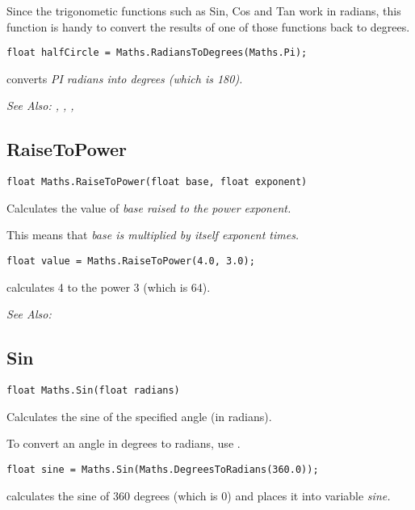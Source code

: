 Since the trigonometic functions such as Sin, Cos and Tan work in radians, this
function is handy to convert the results of one of those functions back to degrees.

\begin{verbatim}
float halfCircle = Maths.RadiansToDegrees(Maths.Pi);
\end{verbatim}
converts \it{PI} radians into degrees (which is 180).

\it{See Also:} ,
,
, 


\subsection{RaiseToPower}\label{Maths.RaiseToPower}%

\begin{verbatim}
float Maths.RaiseToPower(float base, float exponent)
\end{verbatim}
Calculates the value of \it{base} raised to the power \it{exponent}.

This means that \it{base} is multiplied by itself \it{exponent} times.

\begin{verbatim}
float value = Maths.RaiseToPower(4.0, 3.0);
\end{verbatim}
calculates 4 to the power 3 (which is 64).

\it{See Also:} 


\subsection{Sin}\label{Maths.Sin}%

\begin{verbatim}
float Maths.Sin(float radians)
\end{verbatim}
Calculates the sine of the specified angle (in radians).

To convert an angle in degrees to radians, use .

\begin{verbatim}
float sine = Maths.Sin(Maths.DegreesToRadians(360.0));
\end{verbatim}
calculates the sine of 360 degrees (which is 0) and places it into variable \it{sine}.

